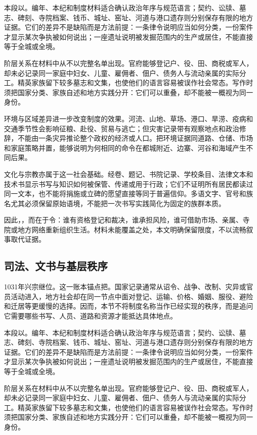 本段以。编年、本纪和制度材料适合确认政治年序与规范语言；契约、讼牍、墓志、碑刻、寺院档案、钱币、城址、窑址、河道与港口遗存则分别保存有限的地方证据。它们的差异不是缺陷而是方法前提：一条律令说明应当如何分类，一份案件才显示某次争执被如何说出；一座遗址说明被发掘范围内的生产或居住，不能直接等于全城或全境。

阶层关系在材料中从不以完整名单出现。官府能够登记户、役、田、商税或军人，却未必记录同一家庭中妇女、儿童、雇佣者、佃户、债务人与流动亲属的实际分工。精英家族留下较多墓志和文集，也使他们的语言容易被误作社会常态。写作时须把国家分类、家族自述和地方实践分开：它们可以重叠，却不能被一概视为同一身份。

环境与区域差异进一步改变制度的效果。河流、山地、草场、港口、旱涝、疫病和交通季节性会影响征粮、赴役、贸易与逃亡；但灾害记录带有观察地点和政治修辞，不能由一条灾异推论整个政权的经济或人口。把环境证据同道路、仓储、市场和家庭策略并置，能够说明为何相同的命令在都城附近、边寨、河谷和海域产生不同后果。

文化与宗教亦属于这一社会基础。经卷、题记、书院记录、学校条目、法律文本和技术书显示书写与知识如何被保管、传递或用于行政；它们不证明所有居民都读过同一文本，也不能将捐施或立碑的愿望直接等同于普遍信仰。多语文字、官号和族名尤其必须保留原始语境，不能把一次书写实践简化为固定的族群本质。

因此，，而在于令：谁有资格登记和裁决，谁承担风险，谁可借助市场、亲属、寺院或地方网络重新组织生活。材料未能覆盖之处，本文明确保留限度，不以流畅叙事取代证据。

\subsection{司法、文书与基层秩序}

1031年兴宗继位。这一账本锚点把。国家记录通常从诏令、战争、改制、灾异或官员活动进入，地方社会却在同一节点中面对登记、运输、价格、婚姻、服役、避险和迁居等更缓慢的选择。因而，本节不将制度名称当作已经实现的秩序，而是追问它需要哪些书写、人员、道路和资源才能抵达具体地点。

本段以。编年、本纪和制度材料适合确认政治年序与规范语言；契约、讼牍、墓志、碑刻、寺院档案、钱币、城址、窑址、河道与港口遗存则分别保存有限的地方证据。它们的差异不是缺陷而是方法前提：一条律令说明应当如何分类，一份案件才显示某次争执被如何说出；一座遗址说明被发掘范围内的生产或居住，不能直接等于全城或全境。

阶层关系在材料中从不以完整名单出现。官府能够登记户、役、田、商税或军人，却未必记录同一家庭中妇女、儿童、雇佣者、佃户、债务人与流动亲属的实际分工。精英家族留下较多墓志和文集，也使他们的语言容易被误作社会常态。写作时须把国家分类、家族自述和地方实践分开：它们可以重叠，却不能被一概视为同一身份。

